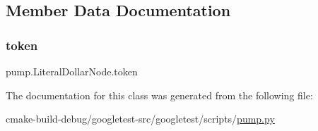 \subsection{Member Data Documentation}
\mbox{\label{classpump_1_1LiteralDollarNode_ab4c6e209635b8868bcdf0fe8053431c6}} 
\subsubsection{\texorpdfstring{token}{token}}
{\footnotesize\ttfamily pump.\+Literal\+Dollar\+Node.\+token}



The documentation for this class was generated from the following file\+:\begin{DoxyCompactItemize}
\item 
cmake-\/build-\/debug/googletest-\/src/googletest/scripts/\mbox{\hyperlink{pump_8py}{pump.\+py}}\end{DoxyCompactItemize}

